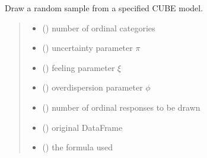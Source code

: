 \documentclass[letterpaper,10pt,english]{sphinxmanual}
\begin{document}
\begin{fulllineitems}
\label{\detokenize{cubmods:cubmods.cube.draw}}
\pysigstartsignatures
{}
\pysigstopsignatures
\sphinxAtStartPar
Draw a random sample from a specified CUBE model.
\begin{quote}\begin{description}
\begin{itemize}
\item {} 
\sphinxAtStartPar
{} () \textendash{} number of ordinal categories

\item {} 
\sphinxAtStartPar
{} () \textendash{} uncertainty parameter \(\pi\)

\item {} 
\sphinxAtStartPar
{} () \textendash{} feeling parameter \(\xi\)

\item {} 
\sphinxAtStartPar
{} () \textendash{} overdispersion parameter \(\phi\)

\item {} 
\sphinxAtStartPar
{} () \textendash{} number of ordinal responses to be drawn

\item {} 
\sphinxAtStartPar
{} () \textendash{} original DataFrame

\item {} 
\sphinxAtStartPar
{} () \textendash{} the formula used


\end{itemize}
\end{description}
\end{quote}
\end{fulllineitems}
\end{document}
